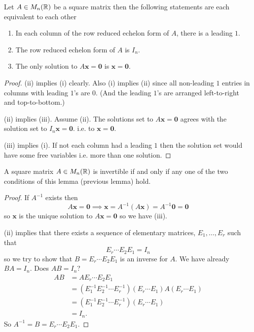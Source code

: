 \documentclass[10pt, a4paper]{article}
\newcommand{\mbf}[1]{\mathbf{#1}}
\begin{document}
\begin{lemma}
    Let $A \in M_n(\mathbb{R})$ be a square matrix then the following statements are each equivalent to each other
    \begin{enumerate}[label = (\roman*)]
        \item In each column of the row reduced echelon form of $A$,
        there is a leading $1$.
        \item The row reduced echelon form of $A$ is $I_n$.
        \item The only solution to $A\mbf{x} = \mbf{0}$ is $\mbf{x} = \mbf{0}$.
    \end{enumerate}
    \begin{proof}
        (ii) implies (i) clearly.
        Also (i) implies (ii) since all non-leading $1$ entries in columns with leading $1$'s are $0$.
        (And the leading $1$'s are arranged left-to-right and top-to-bottom.)

        (ii) implies (iii). Assume (ii).
        The solutions set to $A\mbf{x} = \mbf{0}$ agrees with the solution set to
        $I_n\mbf{x} = \mbf{0}$. i.e. to $\mbf{x} = \mbf{0}$.

        (iii) implies (i).
        If not each column had a leading $1$ then the solution set would have some free variables i.e. more than one solution.
    \end{proof}
\end{lemma}

\begin{theorem}
    A square matrix $A \in M_n(\mathbb{R})$ is invertible if and only if any one of the two conditions of this lemma (previous lemma) hold.
    \begin{proof}
        If $A ^ {-1}$ exists then
        \[
        A\mbf{x} = \mbf{0} \implies \mbf{x} = A ^ {-1}(A\mbf{x}) = A ^ {-1}\mbf{0} = \mbf{0}
        \]
        so $\mbf{x}$ is the unique solution to $A\mbf{x} = \mbf{0}$ so we have (iii).

        (ii) implies that there exists a sequence of elementary matrices,
        $E_1, \dotsc, E_r$ such that
        \[
        E_r \dotsi E_2E_1 = I_n
        \]
        so we try to show that $B = E_r \dotsi E_2 E_1$ is an inverse for $A$.
        We have already $BA = I_n$.
        Does $AB = I_n$?
        \begin{align*}
            AB &= AE_r\dotsi E_2 E_1 \\
            &= (E_1^{-1}E_2^{-1}\dotsi E_r^{-1})(E_r \dotsi E_1)A(E_r \dotsi E_1) \\
            &= (E_1^{-1}E_2^{-1}\dotsi E_r^{-1})(E_r \dotsi E_1) \\
            &= I_n.
        \end{align*}
        So $A ^ {-1} = B = E_r \dotsi E_2E_1$.
    \end{proof}
\end{theorem}
\end{document}

